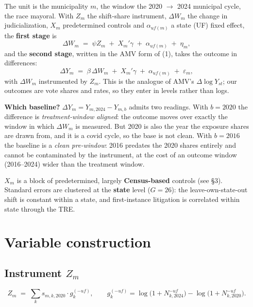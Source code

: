 \documentclass[10pt]{article}
\begin{document}
The unit is the municipality $m$, the window the 2020 $\to$ 2024 municipal cycle, the
race mayoral. With $Z_m$ the shift-share instrument, $\Delta W_m$ the change in
judicialization, $X_m$ predetermined controls and $\alpha_{uf(m)}$ a state (UF) fixed
effect, the \textbf{first stage} is
%
\begin{equation}
\Delta W_m \;=\; \psi Z_m \;+\; X_m'\gamma \;+\; \alpha_{uf(m)} \;+\; \eta_m ,
\end{equation}
%
and the \textbf{second stage}, written in the AMV form of (1), takes the outcome in
differences:
%
\begin{equation}
\Delta Y_{m} \;=\; \beta\, \Delta W_m \;+\; X_m'\gamma \;+\; \alpha_{uf(m)}
  \;+\; \varepsilon_m ,
\end{equation}
%
with $\Delta W_m$ instrumented by $Z_m$. This is the analogue of AMV's $\Delta \log
Y_{st}$; our outcomes are vote shares and rates, so they enter in levels rather than
logs. 


\smallskip
\noindent\textbf{Which baseline?} $\Delta Y_m = Y_{m,2024} - Y_{m,b}$ admits two
readings. With $b = 2020$ the difference is \emph{treatment-window aligned}: the outcome
moves over exactly the window in which $\Delta W_m$ is measured. But 2020 is also the
year the exposure shares are drawn from, and it is a covid cycle, so the base is not
clean. With $b = 2016$ the baseline is a \emph{clean pre-window}: 2016 predates the 2020
shares entirely and cannot be contaminated by the instrument, at the cost of an outcome
window (2016--2024) wider than the treatment window.


\smallskip
\noindent $X_m$ is a block of predetermined, largely \textbf{Census-based} controls (see
\S3). Standard errors are clustered at the \textbf{state} level ($G = 26$): the
leave-own-state-out shift is constant within a state, and first-instance litigation is
correlated within state through the TRE. 
\section{Variable construction}

\subsection*{Instrument $Z_m$ }

\begin{equation*}
Z_m \;=\; \sum_{k} s_{m,k,2020} \cdot g_k^{(-uf)} ,
\qquad
g_k^{(-uf)} = \log\!\big(1 + N^{-uf}_{k,2024}\big) - \log\!\big(1 + N^{-uf}_{k,2020}\big) .
\end{equation*}
\end{document}
